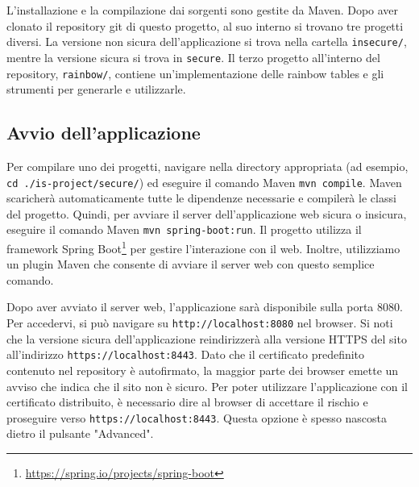 \documentclass[conference,onecolumn,a4paper]{IEEEtran}
\begin{document}
L'installazione e la compilazione dai sorgenti sono gestite da Maven. Dopo aver clonato il repository git di questo progetto, al suo interno si trovano tre progetti diversi. La versione non sicura dell'applicazione si trova nella cartella \verb|insecure/|, mentre la versione sicura si trova in \verb|secure|. Il terzo progetto all'interno del repository, \verb|rainbow/|, contiene un'implementazione delle rainbow tables e gli strumenti per generarle e utilizzarle.

\subsection{Avvio dell'applicazione}

Per compilare uno dei progetti, navigare nella directory appropriata (ad esempio, \verb|cd ./is-project/secure/|) ed eseguire il comando Maven \verb|mvn compile|. Maven scaricherà automaticamente tutte le dipendenze necessarie e compilerà le classi del progetto. Quindi, per avviare il server dell'applicazione web sicura o insicura, eseguire il comando Maven \verb|mvn spring-boot:run|. Il progetto utilizza il framework Spring Boot\footnote{\url{https://spring.io/projects/spring-boot}} per gestire l'interazione con il web. Inoltre, utilizziamo un plugin Maven che consente di avviare il server web con questo semplice comando.

Dopo aver avviato il server web, l'applicazione sarà disponibile sulla porta 8080. Per accedervi, si può navigare su \verb|http://localhost:8080| nel browser. Si noti che la versione sicura dell'applicazione reindirizzerà alla versione HTTPS del sito all'indirizzo \verb|https://localhost:8443|. Dato che il certificato predefinito contenuto nel repository è autofirmato, la maggior parte dei browser emette un avviso che indica che il sito non è sicuro. Per poter utilizzare l'applicazione con il certificato distribuito, è necessario dire al browser di accettare il rischio e proseguire verso \verb|https://localhost:8443|. Questa opzione è spesso nascosta dietro il pulsante "Advanced".
\end{document}
